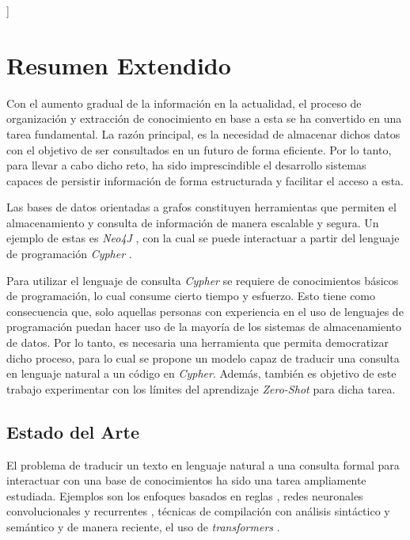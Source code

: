 \documentclass[a4paper,10pt,twocolumn]{article}
\begin{document}
\vspace{0.8cm}
]


\section{Resumen Extendido}\label{sec:intro}
Con el aumento gradual de la información en la actualidad, el proceso de organización y extracción de conocimiento en base a esta se ha convertido en una tarea fundamental. La razón principal, es la necesidad de almacenar dichos datos con el objetivo de ser consultados en un futuro de forma eficiente. Por lo tanto, para llevar a cabo dicho reto, ha sido imprescindible el desarrollo sistemas capaces de persistir información de forma estructurada y facilitar el acceso a esta.

Las bases de datos orientadas a grafos \cite{graph_dbs} constituyen herramientas que permiten el almacenamiento y consulta de información de manera escalable y segura. Un ejemplo de estas es \textit{Neo4J} \cite{neo4j}, con la cual se puede interactuar a partir del lenguaje de programación \textit{Cypher} \cite{cypher}.

Para utilizar el lenguaje de consulta \textit{Cypher} se requiere de conocimientos básicos de programación, lo cual consume cierto tiempo y esfuerzo. Esto tiene como consecuencia que, solo aquellas personas con experiencia en el uso de lenguajes de programación puedan hacer uso de la mayoría de los sistemas de almacenamiento de datos. Por lo tanto, es necesaria una herramienta que permita democratizar dicho proceso, para lo cual se propone un modelo capaz de traducir una consulta en lenguaje natural a un código en \textit{Cypher}. Además, también es objetivo de este trabajo experimentar con los límites del aprendizaje \textit{Zero-Shot} \cite{zeroshot} para dicha tarea. 

\subsection{Estado del Arte}
El problema de traducir un texto en lenguaje natural a una consulta formal para interactuar con una base de conocimientos ha sido una tarea ampliamente estudiada. Ejemplos son los enfoques basados en reglas \cite{rba1}, redes neuronales convolucionales y recurrentes \cite{rnc} \cite{rnr}, técnicas de compilación con análisis sintáctico y semántico \cite{comp} y de manera reciente, el uso de \textit{transformers} \cite{transformers}. 
\end{document}
